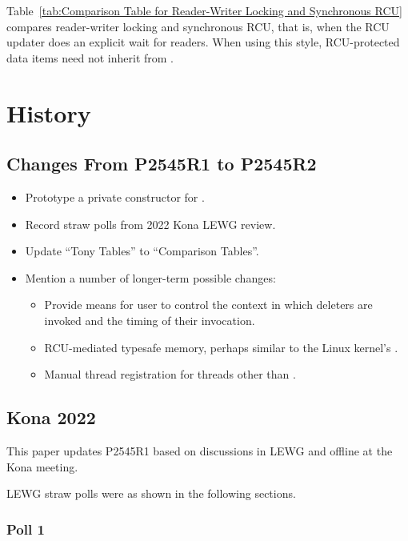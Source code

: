 Table~\ref{tab:Comparison Table for Reader-Writer Locking and Synchronous RCU}
compares reader-writer locking and synchronous RCU, that is, when the
RCU updater does an explicit wait for readers.
When using this style, RCU-protected data items need not inherit from
.

\section{History}
\label{sec:History}

\subsection{Changes From P2545R1 to P2545R2}
\label{sec:Changes From P2545R1 to P2545R2}

\begin{itemize}
\item	Prototype a private constructor for .
\item	Record straw polls from 2022 Kona LEWG review.
\item	Update ``Tony Tables'' to ``Comparison Tables''.
\item	Mention a number of longer-term possible changes:
	\begin{itemize}
	\item	Provide means for user to control the context in
		which deleters are invoked and the timing of their
		invocation.
	\item	RCU-mediated typesafe memory, perhaps similar to the
		Linux kernel's .
	\item	Manual thread registration for threads other than
		.
	\end{itemize}
\end{itemize}

\subsection{Kona 2022}
\label{sec:Kona 2022}

This paper updates P2545R1 based on discussions in LEWG and offline
at the Kona meeting.

LEWG straw polls were as shown in the following sections.

\subsubsection{Poll 1}
\label{sec:kona2022:Poll 1}

